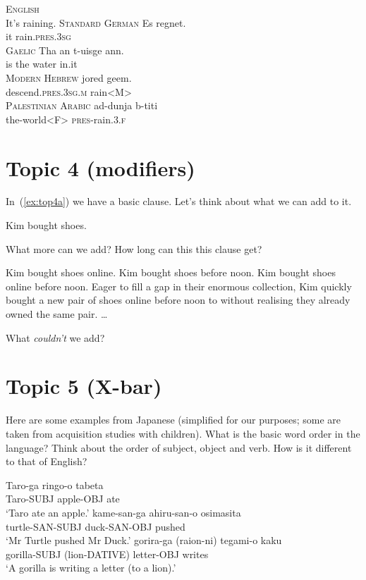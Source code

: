 \documentclass{article}
\begin{document}
\ea \label{ex:top3}
    \ea \textsc{English}\\
        It's raining.
    \ex \textsc{Standard German}
        \gll Es regnet. \\
        it rain.\textsc{pres.3sg} \\
    \ex \textsc{Gaelic} 
        \gll Tha an t-uisge ann. \\
         is the water in.it \\
    \ex \textsc{Modern Hebrew}
        \gll jored geem. \\
        descend.\textsc{pres.3sg.m} rain\textsc{<M>} \\
    \ex \textsc{Palestinian Arabic}
        \gll ad-dunja b-titi \\
        the-world\textsc{<F>} \textsc{pres}-rain.\textsc{3.f} \\
    \z
\z

\section{Topic 4 (modifiers)}
In~(\ref{ex:top4a}) we have a basic clause. Let's think about what we can add to it.

\ea Kim bought shoes. \label{ex:top4a}
\z

What more can we add? How long can this this clause get?

\ea
    \ea Kim bought shoes online.
    \ex Kim bought shoes before noon.
    \ex Kim bought shoes online before noon.
    \ex Eager to fill a gap in their enormous collection, Kim quickly bought a new pair of shoes online before noon to without realising they already owned the same pair.
    \ex \dots{}
    \z
\z

What \emph{couldn't} we add?


\section{Topic 5 (X-bar)}
Here are some examples from Japanese (simplified for our purposes; some are taken from acquisition studies with children). What is the basic word order in the language? Think about the order of subject, object and verb. How is it different to that of English?

\ea
    \ea \gll Taro-ga ringo-o tabeta\\
            Taro-SUBJ apple-OBJ	ate\\
        \glt `Taro ate an apple.'
    \ex \gll kame-san-ga ahiru-san-o osimasita\\
            turtle-SAN-SUBJ duck-SAN-OBJ pushed\\
        \glt `Mr Turtle pushed Mr Duck.'
    \ex \gll gorira-ga (raion-ni) tegami-o kaku\\
            gorilla-SUBJ (lion-DATIVE) letter-OBJ writes\\
        \glt `A gorilla is writing a letter (to a lion).'
    \z
\z
\end{document}
